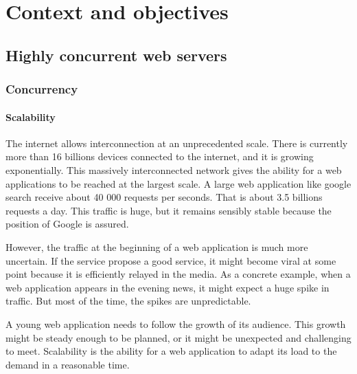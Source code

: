 \chapter{Context and objectives}
\minitoc
\eject



\section{Highly concurrent web servers}

\subsection{Concurrency}

\subsubsection{Scalability}

The internet allows interconnection at an unprecedented scale.
There is currently more than 16 billions devices connected to the internet, and it is growing exponentially.
This massively interconnected network gives the ability for a web applications to be reached at the largest scale.
A large web application like google search receive about 40 000 requests per seconds.
That is about 3.5 billions requests a day.
This traffic is huge, but it remains sensibly stable because the position of Google is assured.


However, the traffic at the beginning of a web application is much more uncertain.
If the service propose a good service, it might become viral at some point because it is efficiently relayed in the media.
As a concrete example, when a web application appears in the evening news, it might expect a huge spike in traffic.
But most of the time, the spikes are unpredictable.

A young web application needs to follow the growth of its audience.
This growth might be steady enough to be planned, or it might be unexpected and challenging to meet.
Scalability is the ability for a web application to adapt its load to the demand in a reasonable time.

